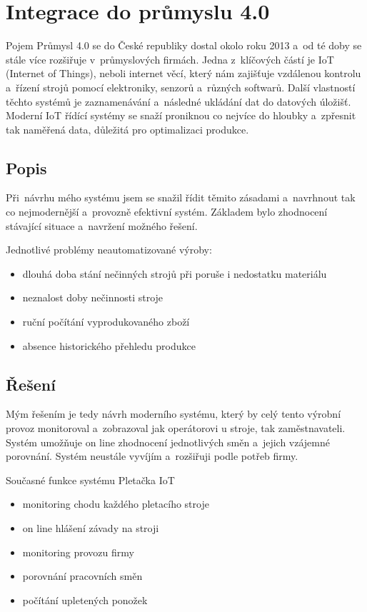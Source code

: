 \chapter{Integrace do průmyslu 4.0}
Pojem Průmysl 4.0 se do České republiky dostal okolo roku 2013 a~od té doby se stále více rozšiřuje v~průmyslových firmách.
Jedna z~klíčových částí je IoT (Internet of Things), neboli internet věcí, který nám zajišťuje vzdálenou kontrolu a~řízení strojů pomocí elektroniky, senzorů a~různých softwarů.
Další vlastností těchto systémů je zaznamenávání a~následné ukládání dat do datových úložišť.
Moderní IoT řídící systémy se snaží proniknou co nejvíce do hloubky a~zpřesnit tak naměřená data, důležitá pro optimalizaci produkce.   

\section{Popis}
Při~návrhu mého systému jsem se snažil řídit těmito zásadami a~navrhnout tak co nejmodernější a~provozně efektivní systém.
Základem bylo zhodnocení stávající situace a~navržení možného řešení.

Jednotlivé problémy neautomatizované výroby:
\begin{itemize}
    \item dlouhá doba stání nečinných strojů při poruše i nedostatku materiálu
    \item neznalost doby nečinnosti stroje
    \item ruční počítání vyprodukovaného zboží
    \item absence historického přehledu produkce
\end{itemize}

\section{Řešení}
Mým řešením je tedy návrh moderního systému, který by celý tento výrobní provoz monitoroval a~zobrazoval jak operátorovi u stroje, tak zaměstnavateli.
Systém umožňuje on line zhodnocení jednotlivých směn a~jejich vzájemné porovnání.
Systém neustále vyvíjím a~rozšiřuji podle potřeb firmy.

Současné funkce systému Pletačka IoT
\begin{itemize}
    \item monitoring chodu každého pletacího stroje
    \item on line hlášení závady na stroji
    \item monitoring provozu firmy
    \item porovnání pracovních směn
    \item počítání upletených ponožek
\end{itemize}



